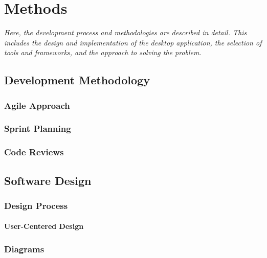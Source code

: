 \chapter{Methods}
\label{chp:methods}

\begin{center}
    \textit{Here, the development process and methodologies are described in detail. This includes the design and implementation of the desktop application, the selection of tools and frameworks, and the approach to solving the problem.}
\end{center}

\section{Development Methodology}
\label{sec:development-methodology}

\subsection{Agile Approach}
\label{subsec:agile-approach}

\subsection{Sprint Planning}
\label{subsec:sprint-planning}

\subsection{Code Reviews}
\label{subsec:code-review}

\section{Software Design}
\label{sec:software-design}

\subsection{Design Process}
\label{subsec:design-process}

\subsubsection*{User-Centered Design}
\label{subsubsec:user-centered-design}

\subsection{Diagrams}
\label{subsec:diagrams}

